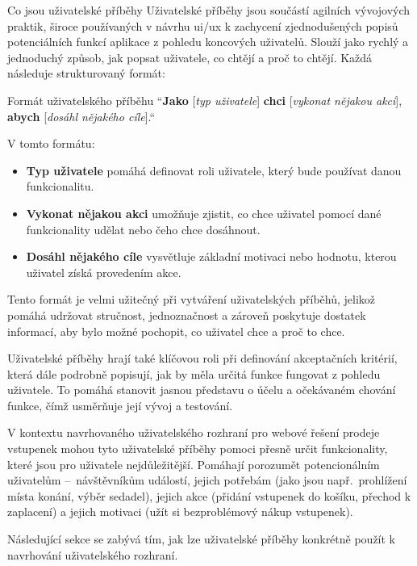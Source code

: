 \begin{subsection}{Co jsou uživatelské příběhy}
    \label{subsec:navrh-ui-uzivatelske-pribehy-co-jsou}
    Uživatelské příběhy jsou součástí agilních vývojových praktik, široce používaných v návrhu \ac{ui}/\ac{ux} k zachycení zjednodušených popisů potenciálních funkcí aplikace z pohledu koncových uživatelů.
    Slouží jako rychlý a jednoduchý způsob, jak popsat uživatele, co chtějí a proč to chtějí\cite{w_articles_user_stories_a_foundation_for_ui_design}.
    Každá  následuje strukturovaný formát:

    \begin{gray-box}{Formát uživatelského příběhu}
        ``\textbf{Jako} [\textit{typ uživatele}] \textbf{chci} [\textit{vykonat nějakou akci}], \textbf{abych} [\textit{dosáhl nějakého cíle}].``
    \end{gray-box}

    \pagebreak
    V tomto formátu:
    \begin{itemize}
        \item \textbf{Typ uživatele} pomáhá definovat roli uživatele, který bude používat danou funkcionalitu.
        \item \textbf{Vykonat nějakou akci} umožňuje zjistit, co chce uživatel pomocí dané funkcionality udělat nebo čeho chce dosáhnout.
        \item \textbf{Dosáhl nějakého cíle} vysvětluje základní motivaci nebo hodnotu, kterou uživatel získá provedením akce.
    \end{itemize}

    Tento formát je velmi užitečný při vytváření uživatelských příběhů, jelikož pomáhá udržovat stručnost, jednoznačnost a zároveň poskytuje dostatek informací, aby bylo možné pochopit, co uživatel chce a proč to chce.

    Uživatelské příběhy hrají také klíčovou roli při definování akceptačních kritérií, která dále podrobně popisují, jak by měla určitá funkce fungovat z pohledu uživatele.
    To pomáhá stanovit jasnou představu o účelu a očekávaném chování funkce, čímž usměrňuje její vývoj a testování\cite{w_articles_user_stories_a_foundation_for_ui_design}.

    V kontextu navrhovaného uživatelského rozhraní pro webové řešení prodeje vstupenek mohou tyto uživatelské příběhy pomoci přesně určit funkcionality, které jsou pro uživatele nejdůležitější.
    Pomáhají porozumět potencionálním uživatelům –~návštěvníkům událostí, jejich potřebám (jako jsou např.\ prohlížení místa konání, výběr sedadel), jejich akce (přidání vstupenek do košíku, přechod k zaplacení) a jejich motivaci (užít si bezproblémový nákup vstupenek).

    Následující sekce se zabývá tím, jak lze uživatelské příběhy konkrétně použít k navrhování uživatelského rozhraní.
\end{subsection}

